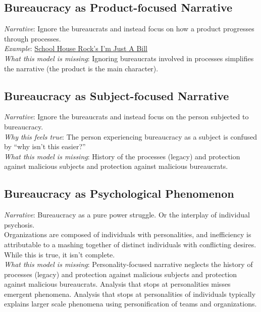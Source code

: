 \subsection*{Bureaucracy as Product-focused Narrative}
\textit{Narrative}: Ignore the bureaucrats and instead focus on how a product progresses through processes.\\
\textit{Example}: \href{https://www.youtube.com/watch?v=OgVKvqTItto}{School House Rock's I'm Just A Bill}\\
\textit{What this model is missing}: Ignoring bureaucrats involved in processes simplifies the narrative (the product is the main character). 

\subsection*{Bureaucracy as Subject-focused Narrative}
\textit{Narrative}: Ignore the bureaucrats and instead focus on the person subjected to bureaucracy. \\
\textit{Why this feels true}: The person experiencing bureaucracy as a subject is confused by ``why isn't this easier?''  \\
\textit{What this model is missing}: History of the processes (legacy) and protection against malicious subjects and protection against malicious bureaucrats. 


\subsection*{Bureaucracy as Psychological Phenomenon}

\textit{Narrative}: Bureaucracy as a pure power struggle. Or the interplay of individual psychosis. \\



Organizations are composed of individuals with personalities, and inefficiency is attributable to a mashing together of distinct individuals with conflicting desires.
While this is true, it isn't complete. \\
\textit{What this model is missing}: Personality-focused narrative neglects the history of processes (legacy) and protection against malicious subjects and protection against malicious bureaucrats. Analysis that stops at personalities misses emergent phenomena. Analysis that stops at personalities of individuals typically explains larger scale phenomena using personification of teams and organizations. 

